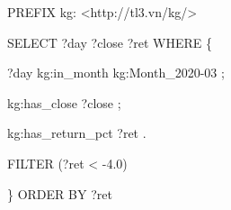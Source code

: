 PREFIX kg: <http://tl3.vn/kg/>\par
SELECT ?day ?close ?ret WHERE \{\par
  ?day kg:in\_month kg:Month\_2020-03 ;\par
       kg:has\_close ?close ;\par
       kg:has\_return\_pct ?ret .\par
  FILTER (?ret < -4.0)\par
\} ORDER BY ?ret\par
